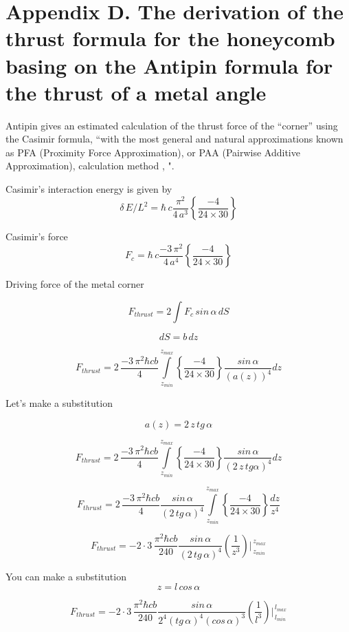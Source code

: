 \documentclass[11pt]{article}
\begin{document}
    \section{Appendix D. The derivation of the thrust formula for the
honeycomb basing on the Antipin formula for the thrust of a metal
angle}\label{appendix-d.-the-derivation-of-the-thrust-formula-for-the-honeycomb-basing-on-the-antipin-formula-for-the-thrust-of-a-metal-angle}

    Antipin \cite{Antipin2012} gives an estimated calculation of the thrust
force of the ``corner'' using the Casimir formula, ``with the most
general and natural approximations known as PFA (Proximity Force
Approximation), or PAA (Pairwise Additive Approximation), calculation
method \cite{Intravaia2013}, \cite{Rodriguez2011}".

Casimir's interaction energy is given by
\[\delta\,E/L^2 = \hbar\,c\frac{\pi^2}{4\,a^3}\left\{\frac{-4}{24\times30}\right\}\]

Casimir's force
\[F_{c} = \hbar\,c\frac{-3\,\pi^2}{4\,a^4}\left\{\frac{-4}{24\times30}\right\}\]

Driving force of the metal corner

\[F_{thrust} = 2 \int F_{c} \, sin\, \alpha \,dS\]

\[dS = b\,dz\]

\[F_{thrust} = 2\, \frac{-3\,\pi^2\hbar c b}{4}\int\limits_{z_{min}}^{z_{max}} \left\{\frac{-4}{24\times30}\right\}\frac{sin\, \alpha}{\left(a\left(z\right)\right)^4}dz\]

Let's make a substitution

\[a\left(z\right) = 2\,z\,tg\, \alpha\]

\[F_{thrust} = 2\, \frac{-3\,\pi^2\hbar c b}{4}\int\limits_{z_{min}}^{z_{max}} \left\{\frac{-4}{24\times30}\right\}\frac{sin\, \alpha}{\left(2\,z\,tg \alpha\right)^4}dz\]

\[F_{thrust} = 2\, \frac{-3\,\pi^2\hbar c b}{4} \frac{sin\, \alpha}{\left(2\,tg\, \alpha\right)^4} \int\limits_{z_{min}}^{z_{max}} \left\{\frac{-4}{24\times30}\right\} \frac{dz}{z^4}\]

\[F_{thrust} = -2\cdot3\, \frac{\pi^2\hbar c b}{240} \frac{sin\, \alpha}{\left(2\,tg\, \alpha\right)^4} \left(\frac{1}{z^3}\right)\Bigg\rvert_{\,z_{min}}^{\,z_{max}} \]

    You can make a substitution \[z = l\, cos\, \alpha\]

\[F_{thrust} = -2\cdot3\, \frac{\pi^2\hbar c b}{240} \frac{sin\, \alpha}{2^4\left(tg\,\alpha\right)^4\left(cos\, \alpha\right)^3} \left(\frac{1}{l^3}\right)\Bigg\rvert_{\,l_{min}}^{\,l_{max}} \]
\end{document}

